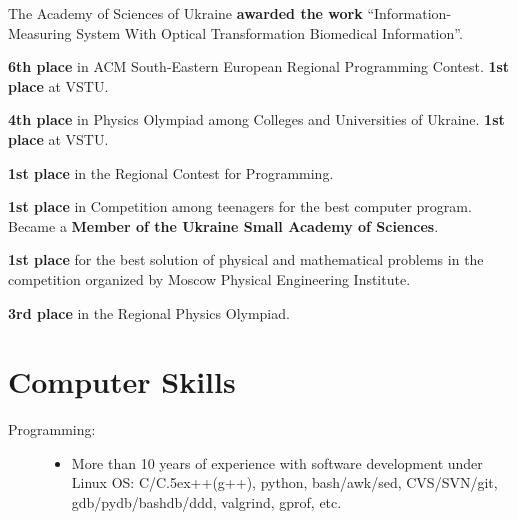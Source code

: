 \documentclass[12pt,overlapped,line]{res}
\def\Cplusplus{{\rm C\raise.5ex\hbox{\small ++}}}
\newcommand{\mplace}[1]{\textbf{#1}}
\begin{document}
\begin{resume}
 \begin{position}
   The Academy of Sciences of Ukraine \mplace{awarded the work}
   ``Information-Measuring System With Optical Transformation
   Biomedical Information''.
 \end{position}

 \begin{position}
   \mplace{6th place} in ACM South-Eastern European Regional
   Programming Contest. \mplace{1st place} at VSTU.
 \end{position}

 \begin{position}
   \mplace{4th place} in Physics Olympiad among Colleges and
   Universities of Ukraine. \mplace{1st place} at VSTU.
 \end{position}

 \begin{position}
 \mplace{1st place} in the Regional Contest for Programming.
 \end{position}

 \begin{position}
   \mplace{1st place} in Competition among teenagers for the best
   computer program. Became a \mplace{Member of the Ukraine Small Academy
     of Sciences}.
 \end{position}

 \begin{position}
   \mplace{1st place} for the best solution of physical and mathematical
   problems in the competition organized by Moscow Physical Engineering Institute.
 \end{position}

 \begin{position}
   \mplace{3rd place} in the Regional Physics Olympiad.

 \end{position}

 \section{Computer Skills}
  \begin{description}

    \item[Programming:]\hspace*{\fill}
      \begin{itemize}
      \item More than 10 years of experience with software development
        under Linux OS: C/\Cplusplus(g++), python, bash/awk/sed,
        CVS/SVN/git, gdb/pydb/bashdb/ddd, valgrind, gprof, etc.


\end{itemize}
\end{description}
\end{resume}
\end{document}
